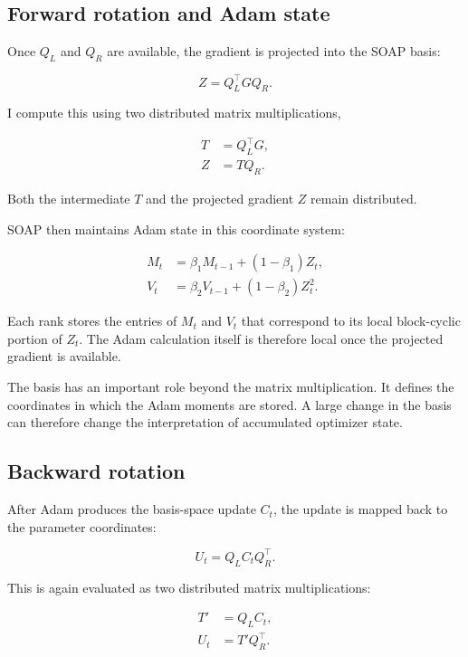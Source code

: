 \documentclass[11pt]{article}
\begin{document}
\subsection{Forward rotation and Adam state}

Once $Q_L$ and $Q_R$ are available, the gradient is projected into the SOAP basis:

\begin{equation}
Z = Q_L^\top GQ_R.
\end{equation}

I compute this using two distributed matrix multiplications,

\begin{align}
T &= Q_L^\top G, \\
Z &= TQ_R.
\end{align}

Both the intermediate $T$ and the projected gradient $Z$ remain distributed.

SOAP then maintains Adam state in this coordinate system:

\begin{align}
M_t &= \beta_1M_{t-1} + (1-\beta_1)Z_t, \\
V_t &= \beta_2V_{t-1} + (1-\beta_2)Z_t^2.
\end{align}

Each rank stores the entries of $M_t$ and $V_t$ that correspond to its local block-cyclic portion of $Z_t$. The Adam calculation itself is therefore local once the projected gradient is available.

The basis has an important role beyond the matrix multiplication. It defines the coordinates in which the Adam moments are stored. A large change in the basis can therefore change the interpretation of accumulated optimizer state.

\subsection{Backward rotation}

After Adam produces the basis-space update $C_t$, the update is mapped back to the parameter coordinates:

\begin{equation}
U_t = Q_L C_t Q_R^\top.
\end{equation}

This is again evaluated as two distributed matrix multiplications:

\begin{align}
T' &= Q_L C_t, \\
U_t &= T'Q_R^\top.
\end{align}
\end{document}
